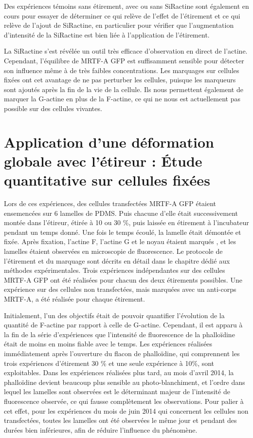 Des expériences témoins sans étirement, avec ou sans SiRactine sont également en cours pour essayer de déterminer ce qui relève de l'effet de l'étirement et ce qui relève de l'ajout de SiRactine, en particulier pour vérifier que l'augmentation d'intensité de la SiRactine est bien liée à l'application de l'étirement. 

La SiRactine s'est révélée un outil très efficace d'observation en direct de l'actine. Cependant, l'équilibre de MRTF-A GFP est suffisamment sensible pour détecter son influence même à de très faibles concentrations. 
Les marquages sur cellules fixées ont cet avantage de ne pas perturber les cellules, puisque les marqueurs sont ajoutés après la fin de la vie de la cellule. 
Ils nous permettent également de marquer la G-actine en plus de la F-actine, ce qui ne nous est actuellement pas possible sur des cellules vivantes. 


\section{Application d'une déformation globale avec l'étireur : \'Etude quantitative sur cellules fixées}

Lors de ces expériences, des cellules transfectées MRTF-A GFP étaient ensemencées sur 6 lamelles de PDMS. Puis chacune d'elle était successivement montée dans l'étireur, étirée à 10 ou 30 \%, puis laissée en étirement à l'incubateur pendant un temps donné. Une fois le temps écoulé, la lamelle était démontée et fixée. Après fixation, l'actine F, l'actine G et le noyau étaient marqués , et les lamelles étaient observées en microscopie de fluorescence. Le protocole de l'étirement et du marquage sont décrits en détail dans le chapitre dédié aux méthodes expérimentales. 
Trois expériences indépendantes sur des cellules MRTF-A GFP ont été réalisées pour chacun des deux étirements possibles. Une expérience sur des cellules non transfectées, mais marquées avec un anti-corps MRTF-A, a été réalisée pour chaque étirement. 

Initialement, l'un des objectifs était de pouvoir quantifier l'évolution de la quantité de F-actine par rapport à celle de G-actine. Cependant, il est apparu à la fin de la série d'expériences que l'intensité de fluorescence de la phalloïdine était de moins en moins fiable avec le temps. Les expériences réalisées immédiatement après l'ouverture du flacon de phalloïdine, qui comprennent les trois expériences d'étirement 30 \% et une seule expérience à 10\%, sont exploitables. Dans les expériences réalisées plus tard, au mois d'avril 2014, la phalloïdine devient beaucoup plus sensible au photo-blanchiment, et l'ordre dans lequel les lamelles sont observées est le déterminant majeur de l'intensité de fluorescence observée, ce qui fausse complètement les observations. 
Pour palier à cet effet, pour les expériences du mois de juin 2014 qui concernent les cellules non transfectées, toutes les lamelles ont été observées le même jour et pendant des durées bien inférieures, afin de réduire l'influence du phénomène. 

